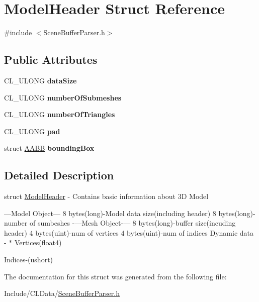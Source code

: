 \hypertarget{struct_model_header}{}\section{Model\+Header Struct Reference}
\label{struct_model_header}


{\ttfamily \#include $<$Scene\+Buffer\+Parser.\+h$>$}

\subsection*{Public Attributes}
\begin{DoxyCompactItemize}
\item 
C\+L\+\_\+\+U\+L\+O\+NG {\bfseries data\+Size}\hypertarget{struct_model_header_ae12a5c1713b2e8aee9fbcd036119f843}{}\label{struct_model_header_ae12a5c1713b2e8aee9fbcd036119f843}

\item 
C\+L\+\_\+\+U\+L\+O\+NG {\bfseries number\+Of\+Submeshes}\hypertarget{struct_model_header_a033e15876ee52cdbe2163f6e7487fef3}{}\label{struct_model_header_a033e15876ee52cdbe2163f6e7487fef3}

\item 
C\+L\+\_\+\+U\+L\+O\+NG {\bfseries number\+Of\+Triangles}\hypertarget{struct_model_header_a773d3cf256a57628e32d4992164a2f10}{}\label{struct_model_header_a773d3cf256a57628e32d4992164a2f10}

\item 
C\+L\+\_\+\+U\+L\+O\+NG {\bfseries pad}\hypertarget{struct_model_header_aab14a6b80307cc60a7aaecb31c5ad51d}{}\label{struct_model_header_aab14a6b80307cc60a7aaecb31c5ad51d}

\item 
struct \hyperlink{struct_a_a_b_b}{A\+A\+BB} {\bfseries bounding\+Box}\hypertarget{struct_model_header_a53c0f7818563dd40ddd54af216de5be0}{}\label{struct_model_header_a53c0f7818563dd40ddd54af216de5be0}

\end{DoxyCompactItemize}


\subsection{Detailed Description}
struct \hyperlink{struct_model_header}{Model\+Header} -\/ Contains basic information about 3D Model

---Model Object--- 8 bytes(long)-\/\+Model data size(including header) 8 bytes(long)-\/number of sumbeshes -\/---Mesh Object-\/--- 8 bytes(long)-\/buffer size(incuding header) 4 bytes(uint)-\/num of vertices 4 bytes(uint)-\/num of indices Dynamic data -\/ $\ast$ Vertices(float4)
\begin{DoxyItemize}
\item Indices-\/(ushort) 
\end{DoxyItemize}

The documentation for this struct was generated from the following file\+:\begin{DoxyCompactItemize}
\item 
Include/\+C\+L\+Data/\hyperlink{_scene_buffer_parser_8h}{Scene\+Buffer\+Parser.\+h}\end{DoxyCompactItemize}
